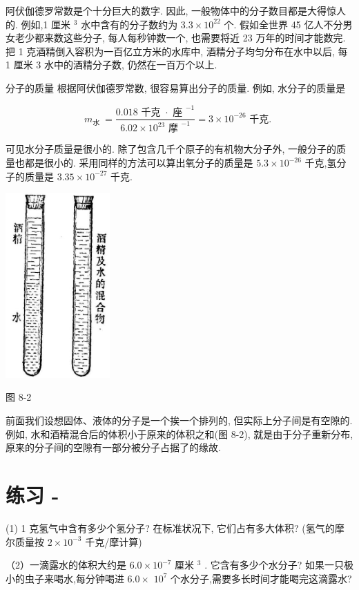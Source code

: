\documentclass[10pt]{article}
\begin{document}
阿伏伽德罗常数是个十分巨大的数字. 因此, 一般物体中的分子数目都是大得惊人的. 例如,1 厘米 \({}^{3}\) 水中含有的分子数约为 \({3.3} \times {10}^{22}\) 个. 假如全世界 45 亿人不分男女老少都来数这些分子, 每人每秒钟数一个, 也需要将近 23 万年的时间才能数完. 把 1 克酒精倒入容积为一百亿立方米的水库中, 酒精分子均匀分布在水中以后, 每 1 厘米 3 水中的酒精分子数, 仍然在一百万个以上.

分子的质量 根据阿伏伽德罗常数, 很容易算出分子的质量. 例如, 水分子的质量是

\[
{m}_{\text{水 }} = \frac{{0.018}\text{ 千克 } \cdot {\text{ 座 }}^{-1}}{{6.02} \times {10}^{23}{\text{ 摩 }}^{-1}} = 3 \times {10}^{-{26}}\text{ 千克. }
\]

可见水分子质量是很小的. 除了包含几千个原子的有机物大分子外, 一般分子的质量也都是很小的. 采用同样的方法可以算出氧分子的质量是 \({5.3} \times {10}^{-{26}}\) 千克,氢分子的质量是 \({3.35} \times {10}^{-{27}}\) 千克.

\begin{center}
\includegraphics[max width=0.3\textwidth]{images/01912d55-147c-70aa-b0e0-1782a122f948_236_376137.jpg}
\end{center}

图 8-2

前面我们设想固体、液体的分子是一个挨一个排列的, 但实际上分子间是有空隙的. 例如, 水和酒精混合后的体积小于原来的体积之和(图 8-2), 就是由于分子重新分布, 原来的分子间的空隙有一部分被分子占据了的缘故.

\section*{练习 -}

(1) 1 克氢气中含有多少个氢分子? 在标准状况下, 它们占有多大体积? (氢气的摩尔质量按 \(2 \times {10}^{-3}\) 千克/摩计算)

（2）一滴露水的体积大约是 \({6.0} \times {10}^{-7}\) 厘米 \({}^{3}\) . 它含有多少个水分子? 如果一只极小的虫子来喝水,每分钟喝进 \({6.0} \times\) \({10}^{7}\) 个水分子,需要多长时间才能喝完这滴露水?
\end{document}
